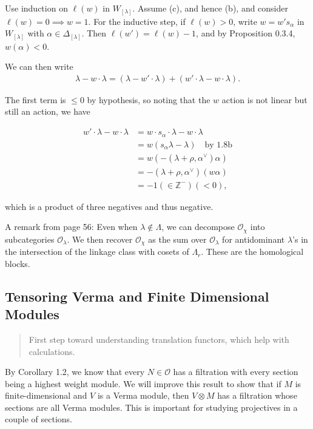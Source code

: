 \documentclass[11pt]{scrartcl}
\theoremstyle{definition}
\theoremstyle{theorem}
\theoremstyle{proof}
\newenvironment{proof}
{\pushQED{$\qed$}\pf}
{\par\popQED\endpf}
\theoremstyle{definition}
\theoremstyle{break}
\theoremstyle{problem}
\newcommand{\ZZ}[0]{{\mathbb{Z}}}
\newcommand{\dual}[0]{^\vee}
\newcommand{\OO}[0]{{\mathcal{O}}}
\newcommand{\tensor}[0]{\otimes}
\renewcommand{\qed}[0]{\hfill\blacksquare}
\begin{document}
\begin{proof}[c implies d]

Use induction on \(\ell(w)\) in \(W_{[\lambda]}\). Assume (c), and hence
(b), and consider \(\ell(w) = 0 \implies w = 1\). For the inductive
step, if \(\ell(w) > 0\), write \(w = w' s_\alpha\) in \(W_{[\lambda]}\)
with \(\alpha \in \Delta_{[\lambda]}\). Then \(\ell(w') = \ell(w) - 1\),
and by Proposition 0.3.4, \(w(\alpha) < 0\).

We can then write
\begin{align*}
\lambda - w\cdot \lambda = (\lambda - w'\cdot \lambda) + (w' \cdot \lambda - w\cdot \lambda)
.\end{align*}

The first term is \(\leq 0\) by hypothesis, so noting that the \(w\)
action is not linear but still an action, we have

\begin{align*}
w' \cdot \lambda - w\cdot \lambda 
&= w\cdot s_\alpha \cdot \lambda - w\cdot \lambda \\
&= w(s_\alpha \lambda - \lambda) \quad\text{by 1.8b} \\
&= w(-(\lambda+\rho, \alpha\dual)\alpha) \\
&= -(\lambda + \rho, \alpha\dual)(w\alpha) \\
&= -1 (\in \ZZ^-)(<0)
,\end{align*}

which is a product of three negatives and thus negative.\end{proof}

A remark from page 56: Even when \(\lambda \not \in \Lambda\), we can
decompose \(\OO_\chi\) into subcategories \(\OO_\lambda\). We then
recover \(\OO_\chi\) as the sum over \(\OO_\lambda\) for antidominant
\(\lambda\)'s in the intersection of the linkage class with cosets of
\(\Lambda_r\). These are the homological blocks.

\hypertarget{tensoring-verma-and-finite-dimensional-modules}{%
\subsection{Tensoring Verma and Finite Dimensional
Modules}\label{tensoring-verma-and-finite-dimensional-modules}}

\begin{quote}
First step toward understanding translation functors, which help with
calculations.
\end{quote}

By Corollary 1.2, we know that every \(N\in \OO\) has a filtration with
every section being a highest weight module. We will improve this result
to show that if \(M\) is finite-dimensional and \(V\) is a Verma module,
then \(V\tensor M\) has a filtration whose sections are all Verma
modules. This is important for studying projectives in a couple of
sections.
\end{document}
